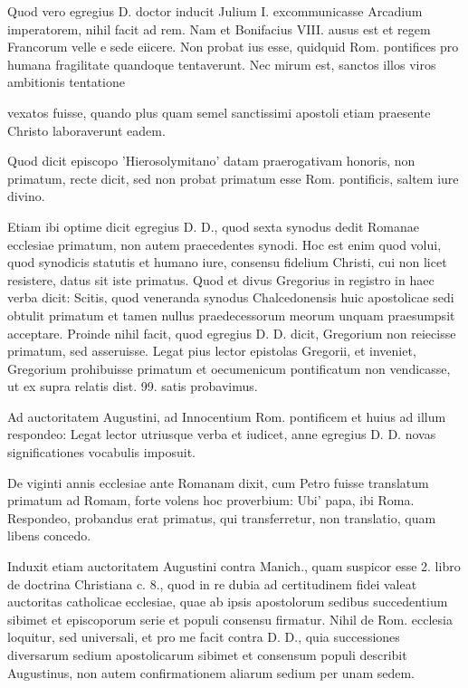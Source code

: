Quod vero egregius D. doctor inducit Julium I. excommunicasse Arcadium imperatorem, nihil facit ad rem. Nam et Bonifacius VIII. ausus est et regem Francorum velle e sede eiicere. Non probat ius esse, quidquid Rom. pontifices pro humana fragilitate quandoque tentaverunt. Nec mirum est, sanctos illos viros ambitionis tentatione

vexatos fuisse, quando plus quam semel sanctissimi apostoli etiam praesente Christo laboraverunt eadem.

Quod dicit episcopo 'Hierosolymitano' datam praerogativam honoris, non primatum, recte dicit, sed non probat primatum esse Rom. pontificis, saltem iure divino.

Etiam ibi optime dicit egregius D. D., quod sexta synodus dedit Romanae ecclesiae primatum, non autem praecedentes synodi. Hoc est enim quod volui, quod synodicis statutis et humano iure, consensu fidelium Christi, cui non licet resistere, datus sit iste primatus. Quod et divus Gregorius in registro in haec verba dicit: Scitis, quod veneranda synodus Chalcedonensis huic apostolicae sedi obtulit primatum et tamen nullus praedecessorum meorum unquam praesumpsit acceptare. Proinde nihil facit, quod egregius D. D. dicit, Gregorium non reiecisse primatum, sed asseruisse. Legat pius lector epistolas\apnota{21}{M [epistolam.} Gregorii, et inveniet, Gregorium prohibuisse primatum et oecumenicum pontificatum non vendicasse, ut ex supra relatis dist. 99. satis probavimus.

Ad auctoritatem Augustini, ad Innocentium Rom. pontificem et huius ad illum respondeo: Legat lector utriusque verba et iudicet, anne egregius D. D. novas significationes vocabulis imposuit.

De viginti annis ecclesiae ante Romanam dixit, cum Petro fuisse translatum primatum ad Romam, forte volens hoc proverbium: Ubi' papa, ibi Roma. Respondeo, probandus erat primatus, qui transferretur, non translatio, quam libens concedo.

Induxit etiam auctoritatem Augustini contra Manich., quam suspicor esse 2. libro de doctrina Christiana c. 8., quod in re dubia ad certitudinem fidei valeat auctoritas catholicae ecclesiae, quae ab ipsis apostolorum sedibus succedentium sibimet et episcoporum serie et populi consensu firmatur. Nihil de Rom. ecclesia loquitur, sed universali, et pro me facit contra D. D., quia successiones diversarum sedium apostolicarum sibimet et consensum populi describit Augustinus, non autem confirmationem aliarum sedium per unam sedem.

